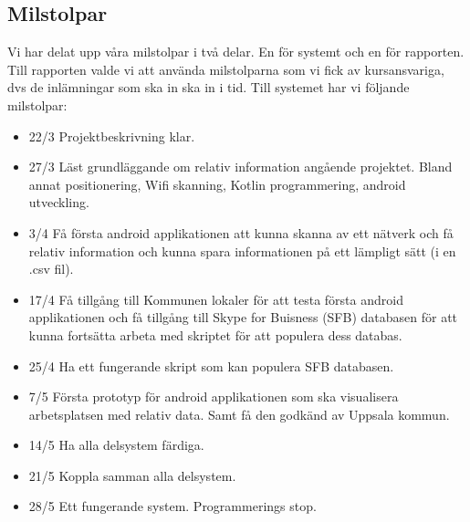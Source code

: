 \documentclass[swedish, a4paper,12pt]{article}
\begin{document}
\subsection{Milstolpar}
Vi har delat upp våra milstolpar i två delar. En för systemt och en för rapporten. Till rapporten valde vi att använda milstolparna som vi fick av kursansvariga, dvs de inlämningar som ska in ska in i tid. Till systemet har vi följande milstolpar:
\begin{itemize}
	\item 22/3 Projektbeskrivning klar.
	\item 27/3 Läst grundläggande om relativ information angående projektet. Bland annat positionering, Wifi skanning, Kotlin programmering, android utveckling.
	\item 3/4 Få första android applikationen att kunna skanna av ett nätverk och få relativ information och kunna spara informationen på ett lämpligt sätt (i en .csv fil).
	\item 17/4 Få tillgång till Kommunen lokaler för att testa första android applikationen och få tillgång till Skype for Buisness (SFB) databasen för att kunna fortsätta arbeta med skriptet för att populera dess databas.
 	\item 25/4 Ha ett fungerande skript som kan populera  SFB databasen.
	\item 7/5 Första prototyp för android applikationen som ska visualisera arbetsplatsen med relativ data. Samt få den godkänd av Uppsala kommun.
	\item 14/5 Ha alla delsystem färdiga.
	\item 21/5 Koppla samman alla delsystem.
	\item 28/5 Ett fungerande system. Programmerings stop.
\end{itemize}
\fi
\end{document}
